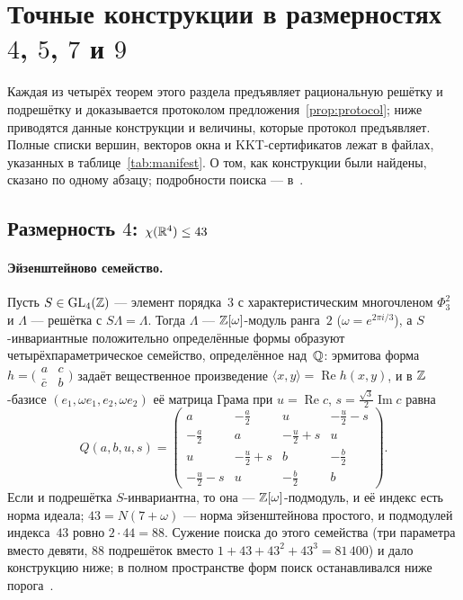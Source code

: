 \section{Точные конструкции в размерностях $4$, $5$, $7$ и $9$}
\label{sec:constr}

Каждая из четырёх теорем этого раздела предъявляет рациональную решётку и
подрешётку и доказывается протоколом предложения~\ref{prop:protocol}; ниже
приводятся данные конструкции и величины, которые протокол предъявляет.
Полные списки вершин, векторов окна и KKT-сертификатов лежат в файлах,
указанных в таблице~\ref{tab:manifest}. О том, как конструкции были найдены,
сказано по одному абзацу; подробности поиска --- в~\cite{Repo}.

\subsection{Размерность $4$: $\chi(\mathbb{R}^4)\le43$}\label{ssec:dim4}

\paragraph{Эйзенштейново семейство.}
Пусть $S\in\mathrm{GL}_4(\mathbb{Z})$ --- элемент порядка~$3$ с характеристическим
многочленом $\Phi_3^2$ и $\Lambda$ --- решётка с $S\Lambda=\Lambda$. Тогда
$\Lambda$ --- $\mathbb{Z}[\omega]$-модуль ранга~$2$ ($\omega=e^{2\pi i/3}$), а
$S$-инвариантные положительно определённые формы образуют
четырёхпараметрическое семейство, определённое над~$\mathbb{Q}$: эрмитова форма
$h=\bigl(\begin{smallmatrix}a&c\\ \bar c&b\end{smallmatrix}\bigr)$ задаёт
вещественное произведение $\langle x,y\rangle=\operatorname{Re}h(x,y)$, и в
$\mathbb{Z}$-базисе $(e_1,\omega e_1,e_2,\omega e_2)$ её матрица Грама при
$u=\operatorname{Re}c$, $s=\tfrac{\sqrt3}{2}\operatorname{Im}c$ равна
\begin{equation}\label{eq:eisform}
Q(a,b,u,s)=\begin{pmatrix}
a & -\tfrac a2 & u & -\tfrac u2-s\\[2pt]
-\tfrac a2 & a & -\tfrac u2+s & u\\[2pt]
u & -\tfrac u2+s & b & -\tfrac b2\\[2pt]
-\tfrac u2-s & u & -\tfrac b2 & b
\end{pmatrix}.
\end{equation}
Если и подрешётка $S$-инвариантна, то она --- $\mathbb{Z}[\omega]$-подмодуль, и её
индекс есть норма идеала; $43=N(7+\omega)$ --- норма эйзенштейнова простого,
и подмодулей индекса~$43$ ровно $2\cdot44=88$. Сужение поиска до этого
семейства (три параметра вместо девяти, $88$ подрешёток вместо
$1+43+43^2+43^3=81\,400$) и дало конструкцию ниже; в полном пространстве форм
поиск останавливался ниже порога~\cite{Repo}.

